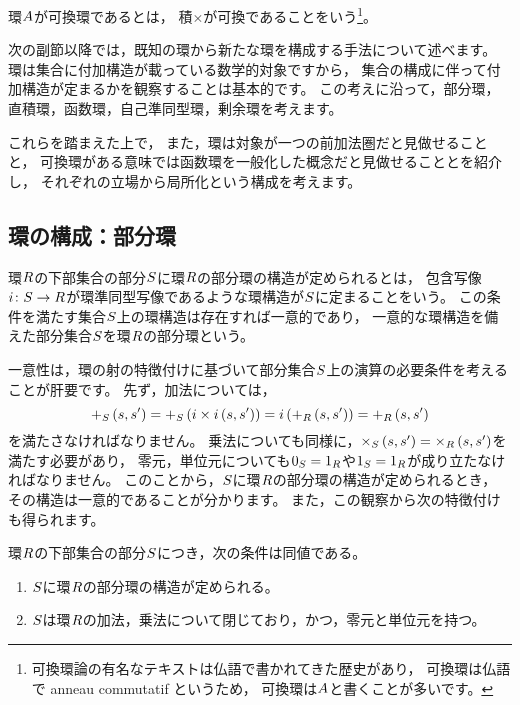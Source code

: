 \begin{definition}
    環\(\CommutativeRing\)が可換環であるとは，
    積\(\times\)が可換であることをいう\footnote{
        可換環論の有名なテキストは仏語で書かれてきた歴史があり，
        可換環は仏語で anneau commutatif というため，
        可換環は\(\CommutativeRing\)と書くことが多いです。
    }。
\end{definition}

次の副節以降では，既知の環から新たな環を構成する手法について述べます。
環は集合に付加構造が載っている数学的対象ですから，
集合の構成に伴って付加構造が定まるかを観察することは基本的です。
この考えに沿って，部分環，直積環，函数環，自己準同型環，剰余環を考えます。

これらを踏まえた上で，
また，環は対象が一つの前加法圏だと見做せることと，
可換環がある意味では函数環を一般化した概念だと見做せることとを紹介し，
それぞれの立場から局所化という構成を考えます。

\subsection{環の構成：部分環}
\begin{definition}
    環\(\Ring\)の下部集合の部分\(\Set<S>\)に環\(\Ring\)の部分環の構造が定められるとは，
    包含写像\(\FunctionStyle{\Map<i>}{\Set<S>}{\Ring}\)が環準同型写像であるような環構造が\(\Set<S>\)に定まることをいう。
    この条件を満たす集合\(\Set<S>\)上の環構造は存在すれば一意的であり，
    一意的な環構造を備えた部分集合\(\Set<S>\)を環\(\Ring\)の部分環という。
\end{definition}

一意性は，環の射の特徴付けに基づいて部分集合\(\Set<S>\)上の演算の必要条件を考えることが肝要です。
先ず，加法については，
\[
    \Map<+_{\Set<S>}>(\Element<s>, \Element<s'>) 
    = \Map<+_{\Set<S>}>(\Map<\Map<i>\times\Map<i>>(\Element<s>, \Element<s'>))
    = \Map<i>(\Map<+_{\Ring}>(\Element<s>, \Element<s'>))
    = \Map<+_{\Ring}>(\Element<s>, \Element<s'>)
\]
を満たさなければなりません。
乗法についても同様に，\(\Map<\times_{\Set<S>}>(\Element<s>, \Element<s'>) = \Map<\times_{\Ring}>(\Element<s>, \Element<s'>)\)を満たす必要があり，
零元，単位元についても\(0_{\Set<S>} = 1_{\Ring}\)や\(1_{\Set<S>}=1_{\Ring}\)が成り立たなければなりません。
このことから，\(\Set<S>\)に環\(\Ring\)の部分環の構造が定められるとき，
その構造は一意的であることが分かります。
また，この観察から次の特徴付けも得られます。

\begin{proposition}
    環\(\Ring\)の下部集合の部分\(\Set<S>\)につき，次の条件は同値である。
    \begin{enumerate}
        \item \(\Set<S>\)に環\(\Ring\)の部分環の構造が定められる。
        \item \(\Set<S>\)は環\(\Ring\)の加法，乗法について閉じており，かつ，零元と単位元を持つ。
    \end{enumerate}
\end{proposition}


